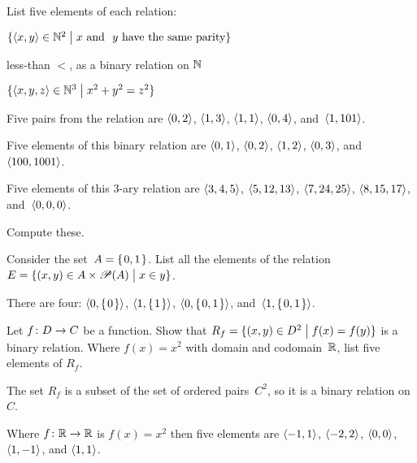 \documentclass{ibl}  %
\begin{document}
\begin{problem}
List five elements of each relation:
\begin{items}
\item $\{\langle x,y\rangle\in \mathbb{N}^2 \bigm| 
     \text{$x$ and ~$y$ have the same parity}\}$
\item less-than $<$, as a binary relation on $\mathbb{N}$
\item $\{\langle x,y,z\rangle\in\mathbb{N}^3 \bigm| x^2+y^2=z^2\}$
\end{items}
\begin{answer}
\begin{items}
\item Five pairs from the relation are
  $\langle0,2\rangle$, $\langle1,3\rangle$, $\langle1,1\rangle$, 
  $\langle0,4\rangle$, 
 and~$\langle1,101\rangle$.    
\item Five elements of this binary relation are 
  $\langle0,1\rangle$, $\langle0,2\rangle$, $\langle1,2\rangle$, $\langle0,3\rangle$,
  and~$\langle100,1001\rangle$. 
\item Five elements of this $3$-ary relation are
  $\langle3,4,5\rangle$, $\langle5,12,13\rangle$, $\langle7,24,25\rangle$, 
  $\langle8,15,17\rangle$, and~$\langle0,0,0\rangle$.
\end{items}
\end{answer}
\end{problem}

\begin{problem}
Compute these.
\begin{exes}
\begin{exercise}
  Consider the set~$A=\mbox{$\{\hspace{0.1em}0,1\hspace{0.1em}\}$}$.
  List all the elements of the relation 
  $E=\{(x,y)\in A\times\mathscr{P}(A) \bigm| x\in y\}$.
\end{exercise}
\begin{answer}
  There are four: $\langle0,\mbox{$\{\hspace{0.1em}0\hspace{0.1em}\}$}\rangle$, 
  $\langle1,\mbox{$\{\hspace{0.1em}1\hspace{0.1em}\}$}\rangle$, $\langle0,\mbox{$\{\hspace{0.1em}0,1\hspace{0.1em}\}$}\rangle$, 
  and~$\langle1,\mbox{$\{\hspace{0.1em}0,1\hspace{0.1em}\}$}\rangle$.   
\end{answer}
\begin{exercise} 
  Let $\mbox{$f\colon D\to C$}$ be a function.
  Show that 
  $R_f=\{(x,y)\in D^2 \bigm| f(x)=f(y)\}$
  is a binary relation.
  Where $f(x)=x^2$ with domain and codomain~$\mathbb{R}$,
  list five elements of $R_f$. 
\end{exercise}
\begin{answer}
  The set $R_f$ is a subset of the set of ordered pairs~$C^2$,
  so it is a binary relation on~$C$.

  Where $\mbox{$f\colon \mathbb{R}\to \mathbb{R}$}$ is $f(x)=x^2$ then five elements are
  $\langle-1,1\rangle$, $\langle-2,2\rangle$, $\langle0,0\rangle$,
  $\langle1,-1\rangle$, and $\langle1,1\rangle$.  
\end{answer}
\end{exes}
\end{problem}
\end{document}
